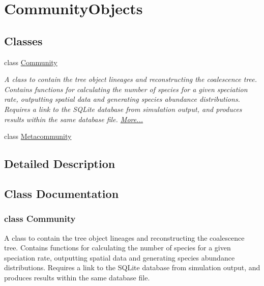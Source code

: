 \hypertarget{group___community_objects}{}\section{Community\+Objects}
\label{group___community_objects}
\subsection*{Classes}
\begin{DoxyCompactItemize}
\item 
class \hyperlink{group___community_objects_class_community}{Community}
\begin{DoxyCompactList}\small\item\em A class to contain the tree object lineages and reconstructing the coalescence tree. Contains functions for calculating the number of species for a given speciation rate, outputting spatial data and generating species abundance distributions. Requires a link to the S\+Q\+Lite database from simulation output, and produces results within the same database file.  \hyperlink{group___community_objects_class_community}{More...}\end{DoxyCompactList}\item 
class \hyperlink{group___community_objects_class_metacommunity}{Metacommunity}
\end{DoxyCompactItemize}


\subsection{Detailed Description}


\subsection{Class Documentation}
\label{class_community}
\hypertarget{group___community_objects_class_community}{}
\subsubsection{class Community}
A class to contain the tree object lineages and reconstructing the coalescence tree. Contains functions for calculating the number of species for a given speciation rate, outputting spatial data and generating species abundance distributions. Requires a link to the S\+Q\+Lite database from simulation output, and produces results within the same database file. 

